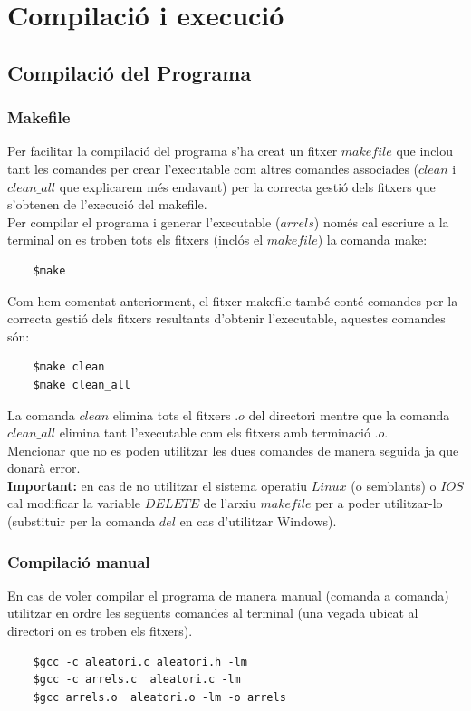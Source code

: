 \documentclass[a4paper, 11pt]{article}
\begin{document}
\newpage
\section{Compilació i execució}
\subsection{Compilació del Programa}
\subsubsection{Makefile}
Per facilitar la compilació del programa s'ha creat un fitxer $makefile$ que inclou tant les comandes per crear l'executable com altres comandes associades ($clean$ i $clean\_all$ que explicarem més endavant) per la correcta gestió dels fitxers que s'obtenen de l'execució del makefile.\\
Per compilar el programa i generar l'executable ($arrels$) només cal escriure a la terminal on es troben tots els fitxers (inclós el $makefile$) la comanda make: 
\begin{verbatim}
    $make
\end{verbatim}
Com hem comentat anteriorment, el fitxer makefile també conté comandes per la correcta gestió dels fitxers resultants d'obtenir l'executable, aquestes comandes són:
\begin{verbatim}
    $make clean
    $make clean_all
\end{verbatim}
La comanda $clean$ elimina tots el fitxers $.o$ del directori mentre que la comanda $clean\_all$ elimina tant l'executable com els fitxers amb terminació $.o$.\\
Mencionar que no es poden utilitzar les dues comandes de manera seguida ja que donarà error.\\
\textbf{Important:} en cas de no utilitzar el sistema operatiu $Linux$ (o semblants) o $IOS$ cal modificar la variable $DELETE$ de l'arxiu $makefile$ per a poder utilitzar-lo (substituir per la comanda $del$ en cas d'utilitzar Windows).

\subsubsection{Compilació manual}
En cas de voler compilar el programa de manera manual (comanda a comanda) utilitzar en ordre les següents comandes al terminal (una vegada ubicat al directori on es troben els fitxers).
\begin{verbatim}
    $gcc -c aleatori.c aleatori.h -lm
    $gcc -c arrels.c  aleatori.c -lm 
    $gcc arrels.o  aleatori.o -lm -o arrels
\end{verbatim}
\newpage
\end{document}
